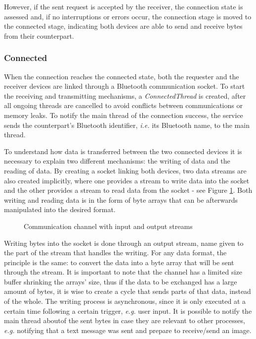 However, if the sent request is accepted by the receiver, the connection state is assessed and, if no interruptions or errors occur, the connection stage is moved to the connected stage, indicating both devices are able to send and receive bytes from their counterpart.

\subsubsection{Connected}
\label{subsubsec:connected}

When the connection reaches the connected state, both the requester and the receiver devices are linked through a Bluetooth communication socket. To start the receiving and transmitting mechanisms, a \textit{ConnectedThread} is created, after all ongoing threads are cancelled to avoid conflicts between communications or memory leaks. To notify the main thread of the connection success, the service sends the counterpart's Bluetooth identifier, \textit{i.e.} its Bluetooth name, to the main thread.

To understand how data is transferred between the two connected devices it is necessary to explain two different mechanisms: the writing of data and the reading of data. By creating a socket linking both devices, two data streams are also created implicitly, where one provides a stream to write data into the socket and the other provides a stream to read data from the socket - see Figure \ref{fig:inoutstreams}. Both writing and reading data is in the form of byte arrays that can be afterwards manipulated into the desired format.

\begin{figure}[ht]
	\noindent{}
	\caption{\label{fig:inoutstreams} Communication channel with input and output streams}
\end{figure}

Writing bytes into the socket is done through an output stream, name given to the part of the stream that handles the writing. For any data format, the principle is the same: to convert the data into a byte array that will be sent through the stream. It is important to note that the channel has a limited size buffer shrinking the arrays' size, thus if the data to be exchanged has a large amount of bytes, it is wise to create a cycle that sends parts of that data, instead of the whole. The writing process is asynchronous, since it is only executed at a certain time following a certain trigger, \textit{e.g.} user input. It is possible to notify the main thread aboutof the sent bytes in case they are relevant to other processes, \textit{e.g.} notifying that a text message was sent and prepare to receive/send an image.

